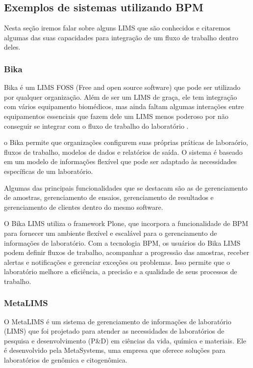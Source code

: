 \subsection{Exemplos de sistemas utilizando BPM} \label{sec:lims-exemplo}

Nesta seção iremos falar sobre alguns LIMS que são conhecidos e citaremos algumas das suas capacidades para integração de um fluxo de trabalho dentro deles.

\subsubsection{Bika}

Bika é um LIMS FOSS (Free and open source software) que pode ser utilizado por qualquer organização. Além de ser um LIMS de graça, ele tem integração com vários equipamento biomédicos, mas ainda faltam algumas interações entre equipamentos essenciais que fazem dele um LIMS menos poderoso por não conseguir se integrar com o fluxo de trabalho do laboratório \cite{Ademuyiwa2018}.

o Bika permite que organizações configurem suas próprias práticas de laboraório, fluxos de trabalho, modelos de dados e relatórios de saída. O sistema é baseado em um modelo de informações flexível que pode ser adaptado às necessidades específicas de um laboratório.

Algumas das principais funcionalidades que se destacam são as de gerenciamento de amostras, gerenciamento de ensaios, gerenciamento de resultados e gerenciamento de clientes dentro do mesmo software.

O Bika LIMS utiliza o framework Plone, que incorpora a funcionalidade de BPM para fornecer um ambiente flexível e escalável para o gerenciamento de informações de laboratório. Com a tecnologia BPM, os usuários do Bika LIMS podem definir fluxos de trabalho, acompanhar a progressão das amostras, receber alertas e notificações e gerenciar exceções ou problemas. Isso permite que o laboratório melhore a eficiência, a precisão e a qualidade de seus processos de trabalho.

\subsubsection{MetaLIMS}

O MetaLIMS é um sistema de gerenciamento de informações de laboratório (LIMS) que foi projetado para atender as necessidades de laboratórios de pesquisa e desenvolvimento (P\&D) em ciências da vida, química e materiais. Ele é desenvolvido pela MetaSystems, uma empresa que oferece soluções para laboratórios de genômica e citogenômica.

